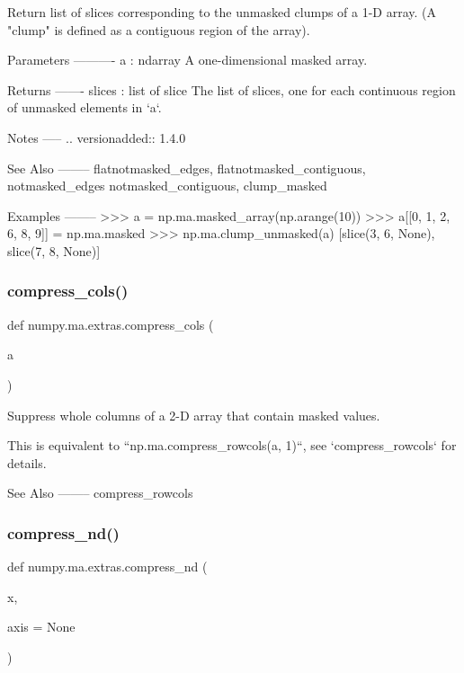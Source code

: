 \begin{DoxyVerb}Return list of slices corresponding to the unmasked clumps of a 1-D array.
(A "clump" is defined as a contiguous region of the array).

Parameters
----------
a : ndarray
    A one-dimensional masked array.

Returns
-------
slices : list of slice
    The list of slices, one for each continuous region of unmasked
    elements in `a`.

Notes
-----
.. versionadded:: 1.4.0

See Also
--------
flatnotmasked_edges, flatnotmasked_contiguous, notmasked_edges
notmasked_contiguous, clump_masked

Examples
--------
>>> a = np.ma.masked_array(np.arange(10))
>>> a[[0, 1, 2, 6, 8, 9]] = np.ma.masked
>>> np.ma.clump_unmasked(a)
[slice(3, 6, None), slice(7, 8, None)]\end{DoxyVerb}
 \mbox{\label{namespacenumpy_1_1ma_1_1extras_a662462674966ffecadfae444a019ac5f}} 
\subsubsection{\texorpdfstring{compress\+\_\+cols()}{compress\_cols()}}
{\footnotesize\ttfamily def numpy.\+ma.\+extras.\+compress\+\_\+cols (\begin{DoxyParamCaption}\item[{}]{a }\end{DoxyParamCaption})}

\begin{DoxyVerb}Suppress whole columns of a 2-D array that contain masked values.

This is equivalent to ``np.ma.compress_rowcols(a, 1)``, see
`compress_rowcols` for details.

See Also
--------
compress_rowcols\end{DoxyVerb}
 \mbox{\label{namespacenumpy_1_1ma_1_1extras_a15ecd62cd3beca94f2e974619669ab58}} 
\subsubsection{\texorpdfstring{compress\+\_\+nd()}{compress\_nd()}}
{\footnotesize\ttfamily def numpy.\+ma.\+extras.\+compress\+\_\+nd (\begin{DoxyParamCaption}\item[{}]{x,  }\item[{}]{axis = {\ttfamily None} }\end{DoxyParamCaption})}


